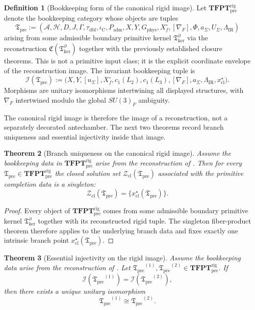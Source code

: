 \documentclass[11pt,a4paper]{article}
\newtheorem{theorem}{Theorem}[section]
\theoremstyle{definition}
\newtheorem{definition}[theorem]{Definition}
\theoremstyle{remark}
\newcommand{\taudbl}{\tau_{\mathrm{dbl}}}
\newcommand{\iC}{\iota_{\mathrm C}}
\newcommand{\Tker}{\mathfrak T_{\mathrm{ker}}}
\newcommand{\Padm}{P_{\mathrm{adm}}}
\newcommand{\Tpre}{\mathfrak T_{\mathrm{pre}}}
\begin{document}
\begin{definition}[Bookkeeping form of the canonical rigid image]
\label{def:tfpt-rigid-pre-category}
Let $\mathbf{TFPT}^{\mathrm{rig}}_{\mathrm{pre}}$ denote the bookkeeping category whose objects are
tuples
\[
\Tpre
:=
(\mathcal A,\mathcal H,D,J,\Gamma,\taudbl,\iC,\Padm,X,Y,G_{\mathrm{phys}},X_f^\circ,[\nabla_F],\Phi,a_\Sigma,U_\Sigma,\Lambda_{\mathrm{IR}})
\]
arising from some admissible boundary primitive kernel $\Tker^\partial$ via the reconstruction
$\mathfrak C(\Tker^\partial)$ together with the previously established closure theorems. This is not a
primitive input class; it is the explicit coordinate envelope of the reconstruction image. The
invariant bookkeeping tuple is
\[
\mathcal I(\Tpre)
:=
\bigl(
X,Y,[u_\Sigma],X_f^\circ,c_1(L_2),c_1(L_3),[\nabla_F],a_\Sigma,\Lambda_{\mathrm{IR}},x_{\mathrm{cl}}^\star
\bigr).
\]
Morphisms are unitary isomorphisms intertwining all displayed structures, with $\nabla_F$
intertwined modulo the global $SU(3)_F$ ambiguity.
\end{definition}

The canonical rigid image is therefore the image of a reconstruction, not a separately decorated
antechamber. The next two theorems record branch uniqueness and essential injectivity inside that
image.

\begin{theorem}[Branch uniqueness on the canonical rigid image]
\label{thm:branch-uniqueness}
Assume the bookkeeping data in $\mathbf{TFPT}^{\mathrm{rig}}_{\mathrm{pre}}$ arise from the
reconstruction of . Then for every
$\Tpre\in\mathbf{TFPT}^{\mathrm{rig}}_{\mathrm{pre}}$ the closed solution set
$\mathcal Z_{\mathrm{cl}}(\Tpre)$ associated with the primitive completion data is a
singleton:
\[
\mathcal Z_{\mathrm{cl}}(\Tpre)=\{x_{\mathrm{cl}}^\star(\Tpre)\}.
\]
\end{theorem}

\begin{proof}
Every object of $\mathbf{TFPT}^{\mathrm{rig}}_{\mathrm{pre}}$ comes from some admissible boundary
primitive kernel $\Tker^\partial$ together with its reconstructed rigid tuple. The singleton
fiber-product theorem
 therefore applies to the underlying branch data and fixes
exactly one intrinsic branch point $x_{\mathrm{cl}}^\star(\Tpre)$.
\end{proof}

\begin{theorem}[Essential injectivity on the rigid image]
\label{thm:spectral-completeness-rigid-tfpt}
Assume the bookkeeping data arise from the reconstruction of
. Let
${\Tpre}^{(1)},{\Tpre}^{(2)}\in\mathbf{TFPT}^{\mathrm{rig}}_{\mathrm{pre}}$. If
\[
\mathcal I({\Tpre}^{(1)})=\mathcal I({\Tpre}^{(2)}),
\]
then there exists a unique unitary isomorphism
\[
{\Tpre}^{(1)}\cong {\Tpre}^{(2)}.
\]
\end{theorem}
\end{document}

